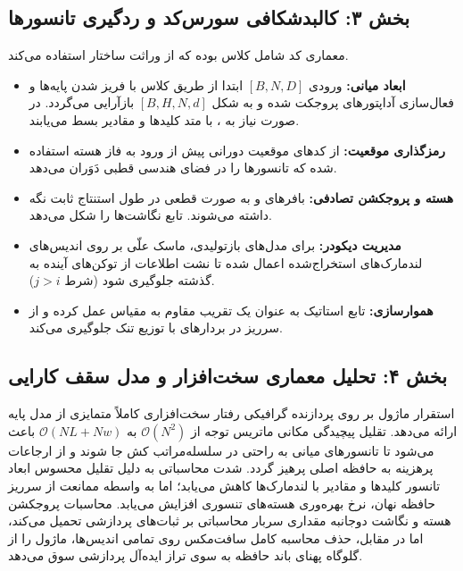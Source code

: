 \subsection*{بخش ۳: کالبدشکافی سورس‌کد و ردگیری تانسورها }
معماری کد شامل کلاس  بوده که از وراثت ساختار  استفاده می‌کند.
\begin{itemize}
    \item \textbf{ابعاد میانی:} ورودی $[B, N, D]$ ابتدا از طریق کلاس  با فریز شدن پایه‌ها و فعال‌سازی آداپتورهای  پروجکت شده و به شکل $[B, H, N, d]$ بازآرایی می‌گردد. در صورت نیاز به ، با متد  کلیدها و مقادیر بسط می‌یابند.
    \item \textbf{رمزگذاری موقعیت:} از کدهای موقعیت دورانی  پیش از ورود به فاز هسته استفاده شده که تانسورها را در فضای هندسی قطبی دَوَران می‌دهد.
    \item \textbf{هسته و پروجکشن تصادفی:} بافرهای  و  به صورت قطعی در طول استنتاج ثابت نگه داشته می‌شوند. تابع  نگاشت‌ها را شکل می‌دهد.
    \item \textbf{مدیریت دیکودر:} برای مدل‌های بازتولیدی، ماسک علّی  بر روی اندیس‌های لندمارک‌های استخراج‌شده اعمال شده تا نشت اطلاعات از توکن‌های آینده به گذشته جلوگیری شود (شرط $j > i$).
    \item \textbf{هموارسازی:} تابع استاتیک  به عنوان یک تقریب مقاوم به مقیاس عمل کرده و از سرریز  در بردارهای با توزیع تنک جلوگیری می‌کند.
\end{itemize}

\subsection*{بخش ۴: تحلیل معماری سخت‌افزار و مدل سقف کارایی }
استقرار ماژول  بر روی پردازنده گرافیکی  رفتار سخت‌افزاری کاملاً متمایزی از مدل پایه ارائه می‌دهد. تقلیل پیچیدگی مکانی ماتریس توجه از $\mathcal{O}(N^2)$ به $\mathcal{O}(NL + Nw)$ باعث می‌شود تا تانسورهای میانی به راحتی در سلسله‌مراتب کش  جا شوند و از ارجاعات پرهزینه به حافظه اصلی  پرهیز گردد.
شدت محاسباتی  به دلیل تقلیل محسوس ابعاد تانسور کلیدها و مقادیر با لندمارک‌ها کاهش می‌یابد؛ اما به واسطه ممانعت از سرریز حافظه نهان، نرخ بهره‌وری هسته‌های تنسوری  افزایش می‌یابد. محاسبات پروجکشن هسته و نگاشت دوجانبه مقداری سربار محاسباتی بر ثبات‌های پردازشی  تحمیل می‌کند، اما در مقابل، حذف محاسبه کامل سافت‌مکس روی تمامی اندیس‌ها، ماژول را از گلوگاه پهنای باند حافظه  به سوی تراز ایده‌آل پردازشی  سوق می‌دهد.

